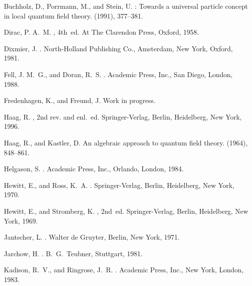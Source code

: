 \documentclass[a4paper,a4paper]{article}
\numberwithin{equation}{section}
\theoremstyle{definition}
\theoremstyle{plain}
\theoremstyle{remark}
\begin{document}
\begin{thebibliography}{10}
{\sc Buchholz, D., Porrmann, M., and Stein, U.}
: Towards a universal particle concept in local
  quantum field theory.
 (1991), 377--381.

{\sc Dirac, P. A.~M.}
, 4th~ed.
\newblock At The Clarendon Press, Oxford, 1958.

{\sc Dixmier, J.}
.
\newblock North-Holland Publishing Co., Amsterdam, New York, Oxford, 1981.

{\sc Fell, J. M.~G., and Doran, R.~S.}
.
\newblock Academic Press, Inc., San Diego, London, 1988.

{\sc Fredenhagen, K., and Freund, J.}
\newblock Work in progress.

{\sc Haag, R.}
, 2nd rev. and enl.~ed.
\newblock Springer-Verlag, Berlin, Heidelberg, New York, 1996.

{\sc Haag, R., and Kastler, D.}
\newblock An algebraic approach to quantum field theory.
 (1964), 848--861.

{\sc Helgason, S.}
.
\newblock Academic Press, Inc., Orlando, London, 1984.

{\sc Hewitt, E., and Ross, K.~A.}
.
\newblock Springer-Verlag, Berlin, Heidelberg, New York, 1970.

{\sc Hewitt, E., and Stromberg, K.}
, 2nd~ed.
\newblock Springer-Verlag, Berlin, Heidelberg, New York, 1969.

{\sc Jantscher, L.}
.
\newblock Walter de Gruyter, Berlin, New York, 1971.

{\sc Jarchow, H.}
.
\newblock B.~G.~Teubner, Stuttgart, 1981.

{\sc Kadison, R.~V., and Ringrose, J.~R.}
.
\newblock Academic Press, Inc., New York, London, 1983.


\end{thebibliography}
\end{document}
